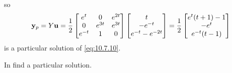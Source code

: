 \begin{solution}
\[\]
so
\[
\mathbf{y}_p=Y\mathbf{u}=
\frac{1}{2}
\begin{bmatrix}e^t&0&e^{2t}\\0&e^{3t}&e^{3t}\\e^{-t}&1&0\end{bmatrix}
\begin{bmatrix}t\\-e^{-t}\\e^{-t}-e^{-2t}\end{bmatrix}
=\dfrac{1}{2}\begin{bmatrix}e^t(t+1)-1\\-e^t\\e^{-t}(t-1)\end{bmatrix}
\]
is a particular solution of  \eqref{eq:10.7.10}.
\end{solution}

\exercises
 In  find a particular
solution.

